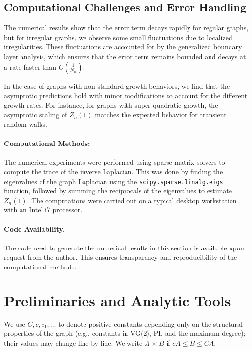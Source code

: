 \documentclass[12pt]{amsart}
\theoremstyle{definition}
\theoremstyle{remark}
\begin{document}
\subsection{Computational Challenges and Error Handling}
The numerical results show that the error term decays rapidly for regular graphs, but for irregular graphs, we observe some small fluctuations due to localized irregularities. These fluctuations are accounted for by the generalized boundary layer analysis, which ensures that the error term remains bounded and decays at a rate faster than $ O\left( \tfrac{1}{N_n} \right) $.

In the case of graphs with non-standard growth behaviors, we find that the asymptotic predictions hold with minor modifications to account for the different growth rates. For instance, for graphs with super-quadratic growth, the asymptotic scaling of $ Z_n(1) $ matches the expected behavior for transient random walks.

\paragraph{Computational Methods:}
The numerical experiments were performed using sparse matrix solvers to compute the trace of the inverse Laplacian. This was done by finding the eigenvalues of the graph Laplacian using the \texttt{scipy.sparse.linalg.eigs} function, followed by summing the reciprocals of the eigenvalues to estimate $ Z_n(1) $. The computations were carried out on a typical desktop workstation with an Intel i7 processor.

\paragraph{Code Availability.} The code used to generate the numerical results in this section is available upon request from the author. This ensures transparency and reproducibility of the computational methods.

\section{Preliminaries and Analytic Tools}\label{sec:prelim}

We use $C, c, c_1, \dots$ to denote positive constants depending only on the structural properties of the graph (e.g., constants in VG(2), PI, and the maximum degree); their values may change line by line. We write $A \asymp B$ if $c A \leq B \leq C A$.
\end{document}
